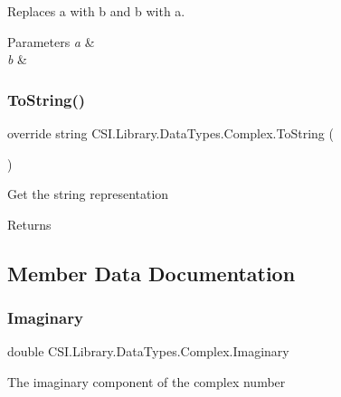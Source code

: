 Replaces a with b and b with a. 


\begin{DoxyParams}{Parameters}
{\em a} & \\
\hline
{\em b} & \\
\hline
\end{DoxyParams}
\mbox{\label{struct_c_s_i_1_1_library_1_1_data_types_1_1_complex_a0169362f3e44a3354c4d8feb00c3d9bc}} 
\subsubsection{\texorpdfstring{ToString()}{ToString()}}
{\footnotesize\ttfamily override string C\+S\+I.\+Library.\+Data\+Types.\+Complex.\+To\+String (\begin{DoxyParamCaption}{ }\end{DoxyParamCaption})\hspace{0.3cm}{\ttfamily [inline]}}



Get the string representation 

\begin{DoxyReturn}{Returns}

\end{DoxyReturn}


\subsection{Member Data Documentation}
\mbox{\label{struct_c_s_i_1_1_library_1_1_data_types_1_1_complex_acc416ca539d366befec1407aa6eda524}} 
\subsubsection{\texorpdfstring{Imaginary}{Imaginary}}
{\footnotesize\ttfamily double C\+S\+I.\+Library.\+Data\+Types.\+Complex.\+Imaginary}



The imaginary component of the complex number 

